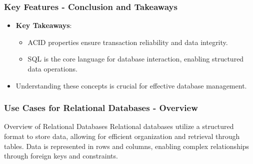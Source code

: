 \documentclass[aspectratio=169]{beamer}
\begin{document}
\begin{frame}[fragile]
    \frametitle{Key Features - Conclusion and Takeaways}
    \begin{itemize}
        \item \textbf{Key Takeaways}:
        \begin{itemize}
            \item ACID properties ensure transaction reliability and data integrity.
            \item SQL is the core language for database interaction, enabling structured data operations.
        \end{itemize}
        \item Understanding these concepts is crucial for effective database management.
    \end{itemize}
\end{frame}

\begin{frame}[fragile]
    \frametitle{Use Cases for Relational Databases - Overview}
    \begin{block}{Overview of Relational Databases}
        Relational databases utilize a structured format to store data, allowing for efficient organization and retrieval through tables. Data is represented in rows and columns, enabling complex relationships through foreign keys and constraints.
    \end{block}
\end{frame}
\end{document}
